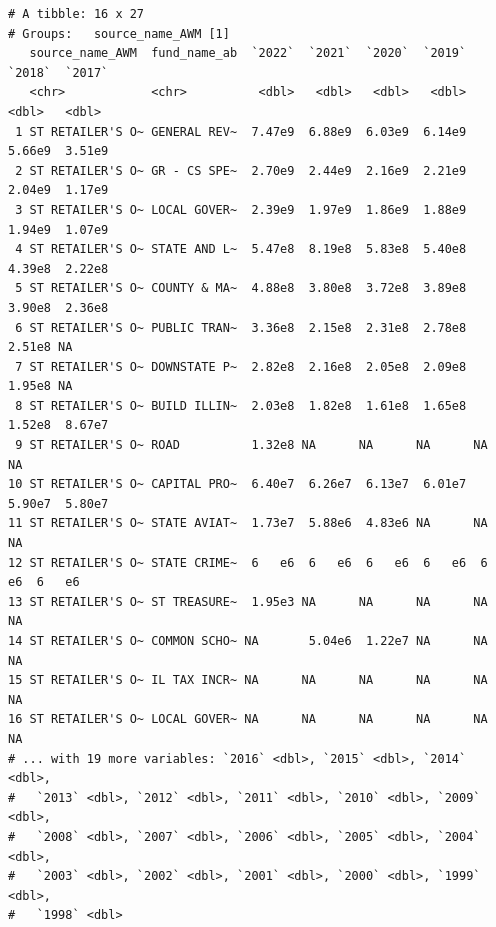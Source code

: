 \documentclass[
  letterpaper,
  DIV=11,
  numbers=noendperiod]{scrreport}
\begin{document}
\begin{verbatim}
# A tibble: 16 x 27
# Groups:   source_name_AWM [1]
   source_name_AWM  fund_name_ab  `2022`  `2021`  `2020`  `2019`  `2018`  `2017`
   <chr>            <chr>          <dbl>   <dbl>   <dbl>   <dbl>   <dbl>   <dbl>
 1 ST RETAILER'S O~ GENERAL REV~  7.47e9  6.88e9  6.03e9  6.14e9  5.66e9  3.51e9
 2 ST RETAILER'S O~ GR - CS SPE~  2.70e9  2.44e9  2.16e9  2.21e9  2.04e9  1.17e9
 3 ST RETAILER'S O~ LOCAL GOVER~  2.39e9  1.97e9  1.86e9  1.88e9  1.94e9  1.07e9
 4 ST RETAILER'S O~ STATE AND L~  5.47e8  8.19e8  5.83e8  5.40e8  4.39e8  2.22e8
 5 ST RETAILER'S O~ COUNTY & MA~  4.88e8  3.80e8  3.72e8  3.89e8  3.90e8  2.36e8
 6 ST RETAILER'S O~ PUBLIC TRAN~  3.36e8  2.15e8  2.31e8  2.78e8  2.51e8 NA     
 7 ST RETAILER'S O~ DOWNSTATE P~  2.82e8  2.16e8  2.05e8  2.09e8  1.95e8 NA     
 8 ST RETAILER'S O~ BUILD ILLIN~  2.03e8  1.82e8  1.61e8  1.65e8  1.52e8  8.67e7
 9 ST RETAILER'S O~ ROAD          1.32e8 NA      NA      NA      NA      NA     
10 ST RETAILER'S O~ CAPITAL PRO~  6.40e7  6.26e7  6.13e7  6.01e7  5.90e7  5.80e7
11 ST RETAILER'S O~ STATE AVIAT~  1.73e7  5.88e6  4.83e6 NA      NA      NA     
12 ST RETAILER'S O~ STATE CRIME~  6   e6  6   e6  6   e6  6   e6  6   e6  6   e6
13 ST RETAILER'S O~ ST TREASURE~  1.95e3 NA      NA      NA      NA      NA     
14 ST RETAILER'S O~ COMMON SCHO~ NA       5.04e6  1.22e7 NA      NA      NA     
15 ST RETAILER'S O~ IL TAX INCR~ NA      NA      NA      NA      NA      NA     
16 ST RETAILER'S O~ LOCAL GOVER~ NA      NA      NA      NA      NA      NA     
# ... with 19 more variables: `2016` <dbl>, `2015` <dbl>, `2014` <dbl>,
#   `2013` <dbl>, `2012` <dbl>, `2011` <dbl>, `2010` <dbl>, `2009` <dbl>,
#   `2008` <dbl>, `2007` <dbl>, `2006` <dbl>, `2005` <dbl>, `2004` <dbl>,
#   `2003` <dbl>, `2002` <dbl>, `2001` <dbl>, `2000` <dbl>, `1999` <dbl>,
#   `1998` <dbl>
\end{verbatim}
\end{document}
